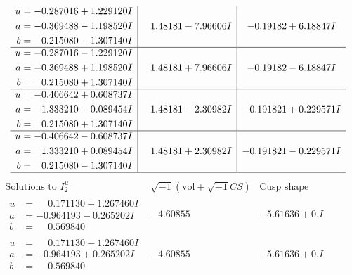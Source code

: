 \documentclass[1p]{elsarticle_modified}
\theoremstyle{definition}
\newcommand{\I}{\sqrt{-1}}
\begin{document}
$$\begin{array}{c|c|c}
\begin{aligned}
u &= -0.287016 + 1.229120 I \\
a &= -0.369488 - 1.198520 I \\
b &= \phantom{-}0.215080 - 1.307140 I\end{aligned}
 & \phantom{-}1.48181 - 7.96606 I & -0.19182 + 6.18847 I \\ \hline\begin{aligned}
u &= -0.287016 - 1.229120 I \\
a &= -0.369488 + 1.198520 I \\
b &= \phantom{-}0.215080 + 1.307140 I\end{aligned}
 & \phantom{-}1.48181 + 7.96606 I & -0.19182 - 6.18847 I \\ \hline\begin{aligned}
u &= -0.406642 + 0.608737 I \\
a &= \phantom{-}1.333210 - 0.089454 I \\
b &= \phantom{-}0.215080 + 1.307140 I\end{aligned}
 & \phantom{-}1.48181 - 2.30982 I & -0.191821 + 0.229571 I \\ \hline\begin{aligned}
u &= -0.406642 - 0.608737 I \\
a &= \phantom{-}1.333210 + 0.089454 I \\
b &= \phantom{-}0.215080 - 1.307140 I\end{aligned}
 & \phantom{-}1.48181 + 2.30982 I & -0.191821 - 0.229571 I\\
 \hline 
 \end{array}$$\newpage$$\begin{array}{c|c|c}  
\text{Solutions to }I^u_{2}& \I (\text{vol} + \sqrt{-1}CS) & \text{Cusp shape}\\
 \hline 
\begin{aligned}
u &= \phantom{-}0.171130 + 1.267460 I \\
a &= -0.964193 - 0.265202 I \\
b &= \phantom{-}0.569840\phantom{ +0.000000I}\end{aligned}
 & -4.60855\phantom{ +0.000000I} & -5.61636 + 0. I\phantom{ +0.000000I} \\ \hline\begin{aligned}
u &= \phantom{-}0.171130 - 1.267460 I \\
a &= -0.964193 + 0.265202 I \\
b &= \phantom{-}0.569840\phantom{ +0.000000I}\end{aligned}
 & -4.60855\phantom{ +0.000000I} & -5.61636 + 0. I\phantom{ +0.000000I} \\ \hline\begin{aligned}

\end{aligned}
\end{array}$$
\end{document}
